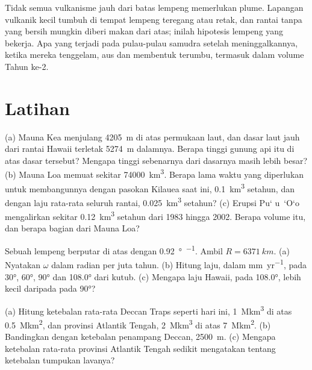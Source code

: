 Tidak semua vulkanisme jauh dari batas lempeng memerlukan plume. Lapangan vulkanik kecil tumbuh di tempat lempeng teregang atau retak, dan rantai tanpa  yang bersih mungkin diberi makan dari  atas; inilah hipotesis lempeng yang bekerja. Apa yang terjadi pada pulau-pulau samudra setelah  meninggalkannya, ketika mereka tenggelam, aus dan membentuk terumbu, termasuk dalam volume Tahun ke-2.

\section{Latihan}

\begin{exercise}[$\star$]\label{exo:b1:hotspots:1}
(a) Mauna Kea menjulang \qty{4205}{m} di atas permukaan laut, dan dasar laut jauh dari rantai Hawaii terletak \qty{5274}{m} dalamnya. Berapa tinggi gunung api itu di atas dasar tersebut? Mengapa tinggi sebenarnya dari dasarnya masih lebih besar? (b) Mauna Loa memuat sekitar \qty{74000}{km^3}. Berapa lama waktu yang diperlukan untuk membangunnya dengan pasokan Kilauea saat ini, \qty{0.1}{km^3} setahun, dan dengan laju rata-rata seluruh rantai, \qty{0.025}{km^3} setahun? (c) Erupsi Pu\textquoteleft
u~\textquoteleft O\textquoteleft o mengalirkan sekitar \qty{0.12}{km^3} setahun dari 1983 hingga 2002. Berapa volume itu, dan berapa bagian dari Mauna Loa?
\end{exercise}

\begin{exercise}[$\star$]\label{exo:b1:hotspots:2}
Sebuah lempeng berputar di atas  dengan \qty{0.92}{\degree\per\Ma}. Ambil $R = \qty{6371}{km}$. (a) Nyatakan $\omega$ dalam radian per juta tahun. (b) Hitung laju, dalam \unit{mm.yr^{-1}},  pada \ang{30}, \ang{60}, \ang{90} dan \ang{108.0} dari kutub. (c) Mengapa laju Hawaii, pada \ang{108.0}, lebih kecil daripada pada \ang{90}?
\end{exercise}

\begin{exercise}[$\star$]\label{exo:b1:hotspots:3}
(a) Hitung ketebalan rata-rata Deccan Traps seperti hari ini, \qty{1}{\mega km^3} di atas \qty{0.5}{\mega km^2}, dan provinsi Atlantik Tengah, \qty{2}{\mega km^3} di atas \qty{7}{\mega km^2}. (b) Bandingkan dengan ketebalan penampang Deccan, \qty{2500}{m}. (c) Mengapa ketebalan rata-rata provinsi Atlantik Tengah sedikit mengatakan tentang ketebalan tumpukan lavanya?
\end{exercise}

